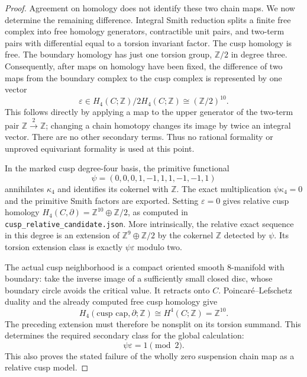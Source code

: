 \begin{proof}
Agreement on homology does not identify these two chain maps.
We now determine the remaining difference.  Integral Smith reduction
splits a finite free complex into free homology generators, contractible
unit pairs, and two-term pairs with differential equal to a torsion
invariant factor.  The cusp homology is free.  The boundary homology
has just one torsion group, $\mathbb Z/2$ in degree three.
Consequently, after maps on homology have been fixed, the difference
of two maps from the boundary complex to the cusp complex is
represented by one vector
\[
 \varepsilon\in H_4(C;\mathbb Z)/2H_4(C;\mathbb Z)
                 \cong(\mathbb Z/2)^{10}.
\tag{1.19.2}
\]
This follows directly by applying a map to the upper generator of
the two-term pair $\mathbb Z\xrightarrow{2}\mathbb Z$; changing a
chain homotopy changes its image by twice an integral vector.
There are no other secondary terms.  Thus no rational formality or
unproved equivariant formality is used at this point.

In the marked cusp degree-four basis, the primitive functional
\[
 \psi=(0,0,0,1,-1,1,1,-1,-1,1)
\tag{1.19.3}
\]
annihilates $\kappa_4$ and identifies its cokernel with $\mathbb Z$.
The exact multiplication $\psi\kappa_4=0$ and the primitive Smith
factors are exported.  Setting $\varepsilon=0$ gives relative
cusp homology $H_4(C,\partial)=\mathbb Z^{10}\oplus\mathbb Z/2$,
as computed in \texttt{cusp\_relative\_candidate.json}.
More intrinsically, the relative exact sequence in this degree is
an extension of $\mathbb Z^9\oplus\mathbb Z/2$ by the cokernel
$\mathbb Z$ detected by $\psi$.  Its torsion extension class is
exactly $\psi\varepsilon$ modulo two.

The actual cusp neighborhood is a compact oriented smooth
8-manifold with boundary: take the inverse image of a sufficiently
small closed disc, whose boundary circle avoids the critical value.
It retracts onto $C$.  Poincar\'e--Lefschetz duality and the already
computed free cusp homology give
\[
 H_4(\text{cusp cap},\partial;\mathbb Z)
       \cong H^4(C;\mathbb Z)=\mathbb Z^{10}.
\]
The preceding extension must therefore be nonsplit on its torsion
summand.  This determines the required secondary class for the global
calculation:
\[
                 \psi\varepsilon=1\pmod2.
\tag{1.19.4}
\]
This also proves the stated failure of the wholly zero suspension
chain map as a relative cusp model.


\end{proof}
